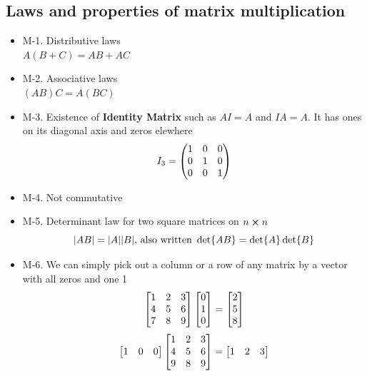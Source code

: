 \documentclass{article}
\begin{document}
    \subsection{Laws and properties of matrix multiplication}
    \begin{itemize}
        \item M-1. Distributive laws\\
        $A(B + C) = AB + AC$
        \item M-2. Associative laws\\
        $(AB)C = A(BC)$
        \item M-3. Existence of \textbf{Identity Matrix} such as $AI=A$ and $IA=A$. It has ones on its diagonal axis and zeros elewhere\\
        \begin{equation}
            I_3 = \pmqty{ 1 & 0 & 0 \\
            0 & 1 & 0 \\
            0 & 0 & 1}
        \end{equation}
        \item M-4. Not commutative
        \item M-5. Determinant law for two square matrices on $n \cross n$\\
        \begin{equation}
            \abs{AB} = \abs{A}\abs{B}\text{, also written } \det{AB}=\det{A}\det{B}
        \end{equation}
        \item M-6. We can simply pick out a column or a row of any matrix by a vector with all zeros and one 1\\
        \begin{equation}
            \bmqty{1 & 2 & 3\\
            4 & 5 & 6 \\
            7 & 8 & 9}
            \bmqty{0 \\ 1 \\ 0}
            =\bmqty{2 \\ 5 \\ 8}
        \end{equation}
        \begin{equation}
            \bmqty{1 & 0 & 0}
            \bmqty{1 & 2 & 3\\
            4 & 5 & 6\\
            9 & 8 & 9}
            =\bmqty{1 & 2 & 3}
        \end{equation}
    \end{itemize}
\end{document}
